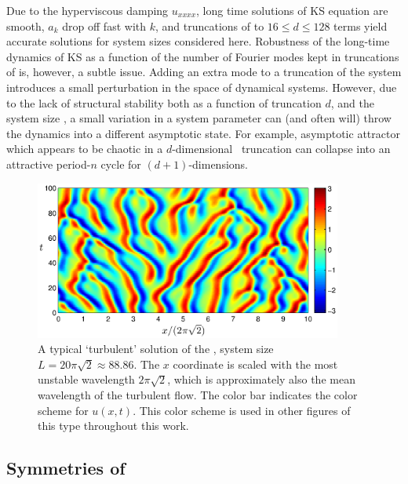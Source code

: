 Due to the hyperviscous damping $u_{xxxx}$, long time solutions of KS
equation are smooth, $a_k$ drop off fast
with $k$,
and truncations of  to $16 \leq d \leq 128$  terms
yield accurate solutions for system sizes considered here.
Robustness of the long-time dynamics of KS as a function of the
number of Fourier modes kept in truncations of  is, however,
a subtle issue.
Adding an extra mode to a truncation of the system
introduces a small perturbation in the space of dynamical
systems. However, due to the lack
of structural stability both as a function of truncation $d$, and the
system size \tildeL, a small variation in a system parameter
can (and often will) throw the dynamics
into a different asymptotic state.
For example, asymptotic attractor
which appears to be chaotic in a $d$-dimensional
\statesp\ truncation can
collapse into an attractive period-$n$ cycle for
$(d\!+\!1)$-dimensions.

\begin{figure}[t]
\begin{center}
\includegraphics[width=0.9\textwidth]{figs/ks_largeL_cbar.eps}
\end{center}
\caption{
A typical `turbulent' solution of the \KSe, system size
$L=20\pi\sqrt{2}\approx 88.86$.  The $x$ coordinate is scaled
with the most unstable wavelength $2\pi\sqrt{2}$, which is
approximately also the mean wavelength of the turbulent flow.
The color bar indicates the color scheme for $u(x,t)$.  This color
scheme is used in other figures of this type throughout this work.
     } \label{f:ks_largeL}
\end{figure}

\subsection{Symmetries of \KSe}
\label{sec:KSeSymm}

